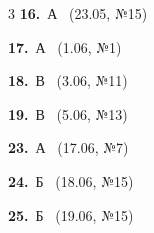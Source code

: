 \documentclass[12pt]{article}
\begin{document}
\ifshowsolutions
{}
\begin{multicols}{3}\noindent
\noindent\textbf{16.}~А \ {\scriptsize\color{gray}(23.05, №15)}\par
\noindent\textbf{17.}~А \ {\scriptsize\color{gray}(1.06, №1)}\par
\noindent\textbf{18.}~В \ {\scriptsize\color{gray}(3.06, №11)}\par
\noindent\textbf{19.}~В \ {\scriptsize\color{gray}(5.06, №13)}\par
\noindent\textbf{23.}~А \ {\scriptsize\color{gray}(17.06, №7)}\par
\noindent\textbf{24.}~Б \ {\scriptsize\color{gray}(18.06, №15)}\par
\noindent\textbf{25.}~Б \ {\scriptsize\color{gray}(19.06, №15)}\par
\end{multicols}
\fi

\endgroup
\end{document}
